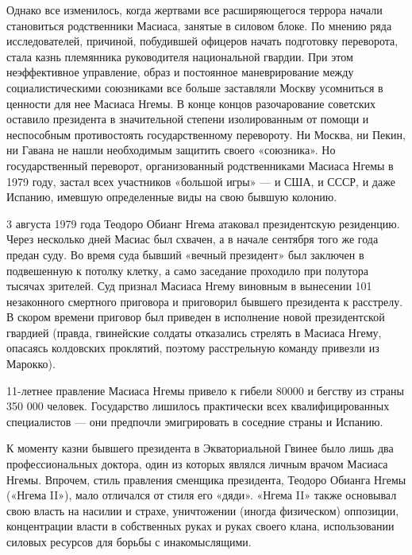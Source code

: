 Однако все изменилось, когда жертвами все расширяющегося террора начали становиться родственники Масиаса, занятые в силовом блоке. По мнению ряда исследователей, причиной, побудившей офицеров начать подготовку переворота, стала казнь племянника руководителя национальной гвардии. При этом неэффективное управление,  образ и постоянное маневрирование между социалистическими союзниками все больше заставляли Москву усомниться в ценности для нее Масиаса Нгемы. В конце концов разочарование советских  оставило президента в значительной степени изолированным от помощи и неспособным противостоять государственному перевороту. Ни Москва, ни Пекин, ни Гавана не нашли необходимым защитить своего «союзника». Но государственный переворот, организованный родственниками Масиаса Нгемы в 1979 году, застал  всех участников «большой игры» --- и США, и СССР, и даже Испанию, имевшую определенные виды на свою бывшую колонию.

3 августа 1979 года  Теодоро Обианг Нгема атаковал президентскую резиденцию. Через несколько дней Масиас был схвачен, а в начале сентября того же года предан суду. Во время суда бывший «вечный президент» был заключен в подвешенную к потолку клетку, а само заседание проходило при полутора тысячах зрителей. Суд признал Масиаса Нгему виновным в вынесении 101 незаконного смертного приговора и приговорил бывшего президента к расстрелу. В скором времени приговор был приведен в исполнение новой президентской гвардией (правда, гвинейские солдаты отказались стрелять в Масиаса Нгему, опасаясь колдовских проклятий, поэтому расстрельную команду привезли из Марокко).

\begin{fancyquotes}
    11-летнее правление Масиаса Нгемы привело к гибели 80000 и бегству из страны 350 000 человек. Государство лишилось практически всех квалифицированных специалистов --- они предпочли эмигрировать в соседние страны и Испанию.
\end{fancyquotes}

К моменту казни бывшего президента в Экваториальной Гвинее было лишь два профессиональных доктора, один из которых являлся личным врачом Масиаса Нгемы. Впрочем, стиль правления сменщика президента, Теодоро Обианга Нгемы («Нгема II»), мало отличался от стиля его «дяди». «Нгема II» также основывал свою власть на насилии и страхе, уничтожении (иногда физическом) оппозиции, концентрации власти в собственных руках и руках своего клана, использовании силовых ресурсов для борьбы с инакомыслящими.

